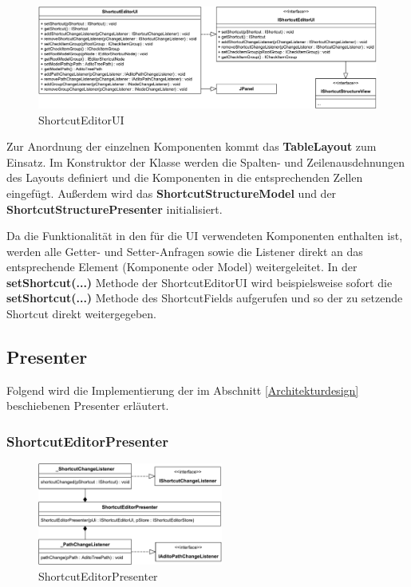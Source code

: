 \begin{figure}[H]
	\centering
	\includegraphics[width=1\linewidth]{../graphic/diagrams/CD_ShortcutEditorUI/ShortcutEditorUI}
	\caption{ShortcutEditorUI}
	\label{fig:shortcuteditorui}
\end{figure} 

\vspace{-12px}

Zur Anordnung der einzelnen Komponenten kommt das \textbf{TableLayout} zum Einsatz. Im Konstruktor der Klasse werden die Spalten- und Zeilenausdehnungen des Layouts definiert und die Komponenten in die entsprechenden Zellen eingefügt. Außerdem wird das \textbf{ShortcutStructureModel} und der \textbf{ShortcutStructurePresenter} initialisiert. 

Da die Funktionalität in den für die UI verwendeten Komponenten enthalten ist, werden alle Getter- und Setter-Anfragen sowie die Listener direkt an das entsprechende Element (Komponente oder Model) weitergeleitet. In der \textbf{setShortcut(...)} Methode der ShortcutEditorUI wird beispielsweise sofort die \textbf{setShortcut(...)} Methode des ShortcutFields aufgerufen und so der zu setzende Shortcut direkt weitergegeben.

\newpage

\subsection{Presenter}

Folgend wird die Implementierung der im Abschnitt \ref{Architekturdesign} beschiebenen Presenter erläutert.

\subsubsection{ShortcutEditorPresenter}

\begin{figure}
	\vspace{-12px}
	\centering
	\includegraphics[width=230px]{../graphic/diagrams/CD_ShortcutEditorPresenter/ShortcutEditorPresenter}
	\caption{ShortcutEditorPresenter}
	\label{fig:shortcuteditorpresenter}
\end{figure}

